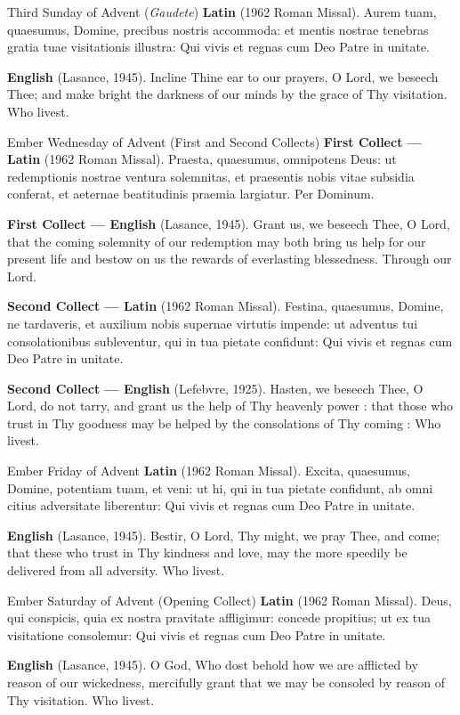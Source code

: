 \begin{massbox}{Third Sunday of Advent (\textit{Gaudete})}
\textbf{Latin} (1962 Roman Missal). Aurem tuam, quaesumus, Domine, precibus
nostris accommoda: et mentis nostrae tenebras gratia tuae visitationis illustra:
Qui vivis et regnas cum Deo Patre in unitate.

\textbf{English} (Lasance, 1945). Incline Thine ear to our prayers, O Lord, we
beseech Thee; and make bright the darkness of our minds by the grace of Thy
visitation. Who livest.
\end{massbox}

\begin{massbox}{Ember Wednesday of Advent (First and Second Collects)}
\textbf{First Collect --- Latin} (1962 Roman Missal). Praesta, quaesumus,
omnipotens Deus: ut redemptionis nostrae ventura solemnitas, et praesentis nobis
vitae subsidia conferat, et aeternae beatitudinis praemia largiatur. Per
Dominum.

\textbf{First Collect --- English} (Lasance, 1945). Grant us, we beseech Thee,
O Lord, that the coming solemnity of our redemption may both bring us help for
our present life and bestow on us the rewards of everlasting blessedness.
Through our Lord.

\textbf{Second Collect --- Latin} (1962 Roman Missal). Festina, quaesumus,
Domine, ne tardaveris, et auxilium nobis supernae virtutis impende: ut adventus
tui consolationibus subleventur, qui in tua pietate confidunt: Qui vivis et
regnas cum Deo Patre in unitate.

\textbf{Second Collect --- English} (Lefebvre, 1925). Hasten, we beseech Thee,
O Lord, do not tarry, and grant us the help of Thy heavenly power : that those
who trust in Thy goodness may be helped by the consolations of Thy coming : Who
livest.
\end{massbox}

\begin{massbox}{Ember Friday of Advent}
\textbf{Latin} (1962 Roman Missal). Excita, quaesumus, Domine, potentiam tuam,
et veni: ut hi, qui in tua pietate confidunt, ab omni citius adversitate
liberentur: Qui vivis et regnas cum Deo Patre in unitate.

\textbf{English} (Lasance, 1945). Bestir, O Lord, Thy might, we pray Thee, and
come; that these who trust in Thy kindness and love, may the more speedily be
delivered from all adversity. Who livest.
\end{massbox}

\begin{massbox}{Ember Saturday of Advent (Opening Collect)}
\textbf{Latin} (1962 Roman Missal). Deus, qui conspicis, quia ex nostra
pravitate affligimur: concede propitius; ut ex tua visitatione consolemur: Qui
vivis et regnas cum Deo Patre in unitate.

\textbf{English} (Lasance, 1945). O God, Who dost behold how we are afflicted by
reason of our wickedness, mercifully grant that we may be consoled by reason of
Thy visitation. Who livest.
\end{massbox}

